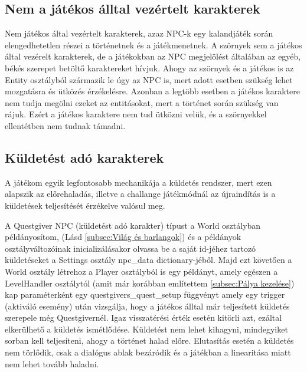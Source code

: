 \subsection{Nem a játékos álltal vezértelt karakterek}
 Nem játékos által vezértelt karakterek, azaz NPC-k egy kalandjáték során elengedhetetlen részei a történetnek és a játékmenetnek. A szörnyek sem a játékos által vezérelt karakterek, de a játékokban az NPC megjelölést általában az egyéb, békés szerepet betöltő karaktereket hívjuk. Ahogy az szörnyek és a játékos is az Entity osztályból származik le úgy az NPC is, mert adott esetben szükség lehet mozgatásra és ütközés érzékelésre. Azonban a legtöbb esetben a játékos karaktere nem tudja megölni ezeket az entitásokat, mert a történet során szükség van rájuk. Ezért a játékos karaktere nem tud ütközni velük, és a szörnyekkel ellentétben nem tudnak támadni.


\subsection{Küldetést adó karakterek}

 A játékom egyik legfontosabb mechanikája a küldetés rendszer, mert ezen alapszik az előrehaladás, illetve a challange játékmódnál az újraindítás is a küldetések teljesítését érzékelve valósul meg. 

A Questgiver NPC (küldetést adó karakter) típust a World osztályban példányosítom, (Lásd \ref{subsec:Világ és barlangok}) és
 a példányok osztályváltozóinak inicializálásakor olvassa be a saját id-jéhez tartozó küldetéseket a Settings osztály npc\_data dictionary-jéből.
  Majd ezt követően a World osztály létrehoz a Player osztályból is egy példányt,
   amely egészen a LevelHandler osztálytól (amit már korábban említettem \ref{subsec:Pálya kezelése}) kap
    paraméterként egy questgivers\_quest\_setup függvényt amely egy trigger (aktiváló esemény) után vizsgálja,
     hogy a játékos álltal már teljesített küldetés szerepel\-e még Questgivernél. Igaz visszatérési érték esetén kitörli azt,
      ezáltal elkerülhető a küldetés ismétlődése. Küldetést nem lehet kihagyni, mindegyiket sorban kell teljesíteni,
       ahogy a történet halad előre. Elutasítás esetén a küldetés nem törlődik, csak a dialógus ablak bezáródik és a játékban a linearitása miatt nem lehet tovább haladni.


